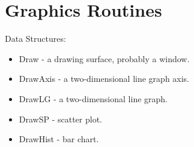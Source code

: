 {\small
\noindent

}

\section{Graphics Routines}

\noindent
Data Structures:
\begin{itemize}
\item Draw - a drawing surface, probably a window.
\item DrawAxis - a two-dimensional line graph axis.
\item DrawLG - a two-dimensional line graph.
\item DrawSP - scatter plot.
\item DrawHist - bar chart.
\end{itemize}


{\small
\noindent

}

